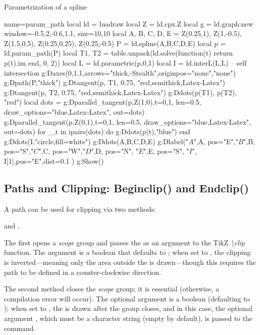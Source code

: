 \begin{demo}{Parametrization of a spline}
\begin{luadraw}{name=param_path}
local ld = luadraw
local Z = ld.cpx.Z
local g = ld.graph:new{ window={-0.5,2,-0.6,1.1}, size={10,10}}
local A, B, C, D, E = Z(0.25,1), Z(1,-0.5), Z(1.5,0.5), Z(0.25,0.25), Z(0.25,-0.5)
P = ld.spline({A,B,C,D,E})
local p = ld.param_path(P)
local T1, T2 = table.unpack(ld.solve(function(t) return p(t).im end, 0, 2))
local L = ld.parametric(p,0,1)
local I = ld.interL(L,L) -- self intersection
g:Daxes({0,1,1},{arrows="thick,-Stealth",originpos={"none","none"}})
g:Dpath(P,"thick")
g:Dtangent(p, T1, 0.75, "red,semithick,Latex-Latex")
g:Dtangent(p, T2, 0.75, "red,semithick,Latex-Latex")
g:Ddots({p(T1), p(T2)}, "red")
local dots = {}
g:Dparallel_tangent(p,Z(1,0),{t={0,1}, len=0.5, draw_options="blue,Latex-Latex", out=dots})
g:Dparallel_tangent(p,Z(0,1),{t={0,1}, len=0.5, draw_options="blue,Latex-Latex", out=dots})
for _,t in ipairs(dots) do g:Ddots(p(t),"blue") end
g:Ddots(I,"circle,fill=white")
g:Ddots({A,B,C,D,E})
g:Dlabel("$A$",A, {pos="E"},"$B$",B, {pos="S"},"$C$",C, {pos="W"},"$D$",D, {pos="N"},
"$E$",E, {pos="S"}, "$I$", I[1],{pos="E",dist=0.1} )
g:Show()
\end{luadraw}
\end{demo}


\subsection{Paths and Clipping: Beginclip() and Endclip()}

A path can be used for clipping via two methods: \par
\hfil {} and .\hfil

The first opens a \emph{scope} group and passes the  as an argument to the TikZ \emph{\textbackslash clip} function. The  argument is a boolean that defaults to \false; when set to \true, the clipping is inverted—meaning only the area outside the  is drawn—though this requires the path to be defined in a counter-clockwise direction.

The second method closes the \emph{scope} group; it is essential (otherwise, a compilation error will occur). The optional argument  is a boolean (defaulting to \false); when set to \true, the  is drawn after the group closes, and in this case, the optional argument , which must be a character string (empty by default), is passed to the \drawcmd command.

